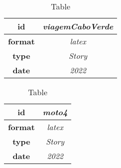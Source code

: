 \begin{table}[h]
    \centering
    \begin{tabular}{|c|c|}
        \hline
        
            \textbf{ id } & \textit{ viagemCaboVerde } \\
            \hline
        
            \textbf{ format } & \textit{ latex } \\
            \hline
        
            \textbf{ type } & \textit{ Story } \\
            \hline
        
            \textbf{ date } & \textit{ 2022 } \\
            \hline
        
    \end{tabular}
    \caption{Table } %
    \label{table:\arabic{tablecounter2}} %
\end{table}

\begin{table}[h]
    \centering
    \begin{tabular}{|c|c|}
        \hline
        
            \textbf{ id } & \textit{ moto4 } \\
            \hline
        
            \textbf{ format } & \textit{ latex } \\
            \hline
        
            \textbf{ type } & \textit{ Story } \\
            \hline
        
            \textbf{ date } & \textit{ 2022 } \\
            \hline
        
    \end{tabular}
    \caption{Table } %
    \label{table:\arabic{tablecounter2}} %
\end{table}

